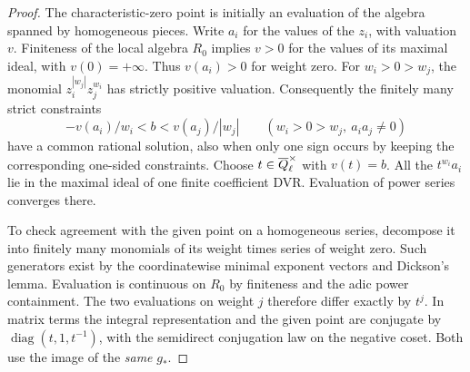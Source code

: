 \begin{proof}
The characteristic-zero point is initially an evaluation of
the algebra spanned by homogeneous pieces. Write \(a_i\)
for the values of the \(z_i\), with valuation \(v\). Finiteness
of the local algebra \(R_0\) implies \(v>0\) for the values
of its maximal ideal, with \(v(0)=+\infty\). Thus \(v(a_i)>0\)
for weight zero. For \(w_i>0>w_j\), the monomial
\(z_i^{|w_j|}z_j^{w_i}\) has strictly positive valuation.
Consequently the finitely many strict constraints
\[
             -v(a_i)/w_i < b < v(a_j)/|w_j|
                \qquad(w_i>0>w_j,\ a_ia_j\ne0)
\]
have a common rational solution, also when only one sign
occurs by keeping the corresponding one-sided constraints.
Choose \(t\in\overline{Q}_\ell^\times\) with \(v(t)=b\).
All the \(t^{w_i}a_i\) lie in the maximal ideal of one finite
coefficient DVR. Evaluation of power series converges there.

To check agreement with the given point on a homogeneous
series, decompose it into finitely many monomials of its weight
times series of weight zero. Such generators exist by the
coordinatewise minimal exponent vectors and Dickson's lemma.
Evaluation is continuous on \(R_0\) by finiteness and the
adic power containment. The two evaluations on weight \(j\)
therefore differ exactly by \(t^j\). In matrix terms the
integral representation and the given point are conjugate
by \(\operatorname{diag}(t,1,t^{-1})\), with the semidirect
conjugation law on the negative coset. Both use the image of
the \emph{same} \(g_*\).
\end{proof}

